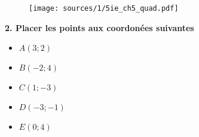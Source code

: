\documentclass[10pt]{article}
\begin{document}
\begin{multicols}{2}
  \begin{figure}[H]
    \centering
    \texttt{[image: sources/1/5ie\_ch5\_quad.pdf]}
  \end{figure}    

  \textbf{2. Placer les points aux coordonées suivantes}

  \begin{itemize}
  \item $A(3  ;  2)$
  \item $B(-2 ;  4)$
  \item $C(1  ; -3)$
  \item $D(-3 ; -1)$
  \item $E(0  ;  4)$
  \end{itemize}

\end{multicols}
\end{document}
